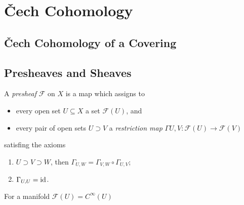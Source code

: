
\chapter{\v{C}ech Cohomology}

\section{\v{C}ech Cohomology of a Covering}

\section[Presheaves and Sheaves]{Presheaves and Sheaves}

\newcommand{\F}{\mathcal{F}}
\newcommand{\G}{\Gamma}

\begin{definition}
    A \emph{presheaf} \(\F\) on \(X\) is a map which assigns to \begin{itemize}
        \item every open set \(U\subseteq X\) a set \(\F(U)\), and
        \item every pair of open sets \(U\supset V\) a \emph{restriction map} \(\G{U,V}:\F(U)\to\F(V)\)
    \end{itemize} satisfing the axioms \begin{enumerate}[label=(\textit{\arabic*})]
        \item \(U\supset V\supset W\), then \(\G_{U,W} = \G_{V,W}\circ\G_{U,V}\);
        \item \(\G_{U,U} = \id\).
    \end{enumerate}
\end{definition}

\begin{example}
    For a manifold \(\F(U) = C^\infty(U)\)
\end{example}